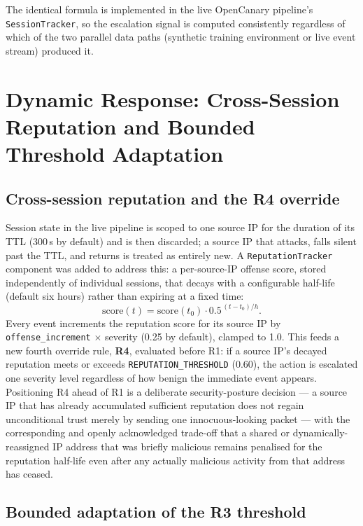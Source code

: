 The identical formula is implemented in the live OpenCanary pipeline's
\texttt{SessionTracker}, so the escalation signal is computed
consistently regardless of which of the two parallel data paths
(synthetic training environment or live event stream) produced it.

\section{Dynamic Response: Cross-Session Reputation and Bounded Threshold Adaptation}

\subsection{Cross-session reputation and the R4 override}

Session state in the live pipeline is scoped to one source IP for the
duration of its TTL (300\,s by default) and is then discarded; a source
IP that attacks, falls silent past the TTL, and returns is treated as
entirely new. A \texttt{ReputationTracker} component was added to address
this: a per-source-IP offense score, stored independently of individual
sessions, that decays with a configurable half-life (default six hours)
rather than expiring at a fixed time:
\begin{equation}
  \text{score}(t) = \text{score}(t_0) \cdot 0.5^{\,(t - t_0)/h}.
\end{equation}
Every event increments the reputation score for its source IP by
\texttt{offense\_increment} $\times$ severity (0.25 by default), clamped
to 1.0. This feeds a new fourth override rule, \textbf{R4}, evaluated
before R1: if a source IP's decayed reputation meets or exceeds
\texttt{REPUTATION\_THRESHOLD} (0.60), the action is escalated one
severity level regardless of how benign the immediate event appears.
Positioning R4 ahead of R1 is a deliberate security-posture decision --- a
source IP that has already accumulated sufficient reputation does not
regain unconditional trust merely by sending one innocuous-looking packet
--- with the corresponding and openly acknowledged trade-off that a
shared or dynamically-reassigned IP address that was briefly malicious
remains penalised for the reputation half-life even after any actually
malicious activity from that address has ceased.

\subsection{Bounded adaptation of the R3 threshold}

